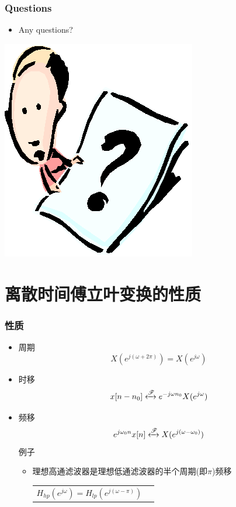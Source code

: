 \documentclass[CJKutf8,xcolor=pdftex,dvipsnames,table]{beamer}
\begin{document}
\begin{CJK*}{UTF8}{song}
  \begin{frame}
    \frametitle{Questions}
    \begin{itemize}
    \item Any questions?
    \end{itemize}
    \begin{center}
      \includegraphics[scale=.5]{question}
    \end{center}
  \end{frame}       
        
	\section{离散时间傅立叶变换的性质}

  \begin{frame}
    \frametitle{性质}
    \begin{itemize}
    \item 周期
    \[
    	X(e^{j(\omega+2\pi)})=X(e^{j\omega})
	\]
    \item 时移
    \[
    	x[n-n_0] \xleftrightarrow{\mathscr{F}} e^{-j\omega n_0}X(e^{j\omega})
	\]
    \item 频移
    \[
    	e^{j\omega_0 n}x[n] \xleftrightarrow{\mathscr{F}} X(e^{j(\omega-\omega_0)})
	\]	
	例子
    	\begin{itemize}
    	\item 理想高通滤波器是理想低通滤波器的半个周期(即$\pi$)频移 \\
	\begin{tabular}{ll}
	\raisebox{-.5\height}

$H_{hp}(e^{j\omega})=H_{lp}(e^{j(\omega-\pi)})$


\end{tabular}
\end{itemize}
\end{itemize}
\end{frame}
\end{CJK*}
\end{document}
